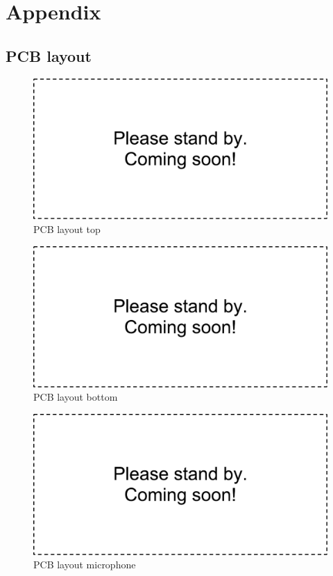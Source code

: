 \chapter{Appendix}

\section{PCB layout}
\begin{figure}[htb]
\includegraphics[width=\columnwidth]{Images/dummy}
\caption{PCB layout top}
\label{fig:pcb_layout_top}
\end{figure}

\begin{figure}[htb]
\includegraphics[width=\columnwidth]{Images/dummy}
\caption{PCB layout bottom}
\label{fig:pcb_layout_bottom}
\end{figure}

\begin{figure}[htb]
\includegraphics[width=\columnwidth]{Images/dummy}
\caption{PCB layout microphone}
\label{fig:pcb_layout_mic}
\end{figure}

